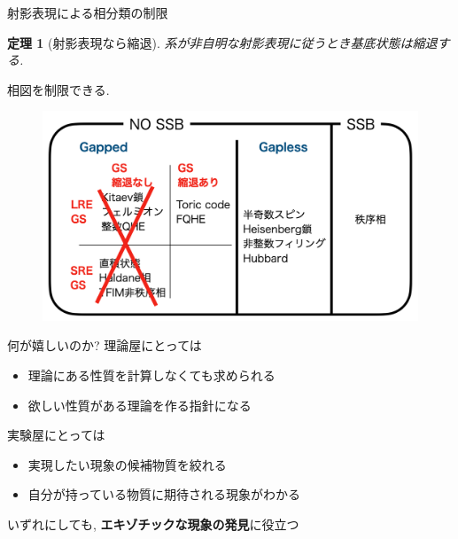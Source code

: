 \documentclass[dvipdfm]{beamer}
\newtheorem*{them}{定理}
\begin{document}



\begin{frame}{射影表現による相分類の制限}
    \begin{them}[射影表現なら縮退]
        系が非自明な射影表現に従うとき基底状態は縮退する. 
    \end{them}
    相図を制限できる. 
    \begin{figure}
        \centering
        \includegraphics[width=0.8\linewidth]{phaseLSM.png}
    \end{figure}
\end{frame}


\begin{frame}{何が嬉しいのか?}
    理論屋にとっては
    \begin{itemize}
        \item 理論にある性質を計算しなくても求められる
        \item 欲しい性質がある理論を作る指針になる
    \end{itemize}
    実験屋にとっては
    \begin{itemize}
        \item 実現したい現象の候補物質を絞れる
        \item 自分が持っている物質に期待される現象がわかる
    \end{itemize}
    いずれにしても, \alert{\textbf{エキゾチックな現象の発見}}に役立つ
\end{frame}
\end{document}
